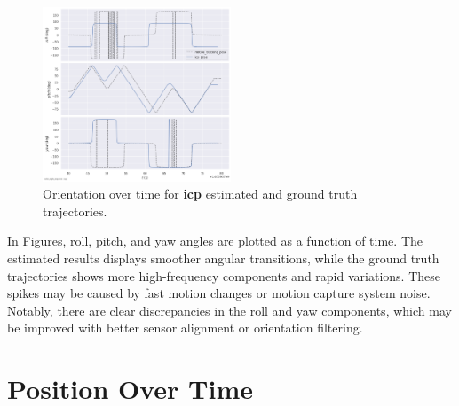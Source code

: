 \documentclass[11pt]{article}
\begin{document}
\begin{figure}[H]
    \centering
    \includegraphics[width=0.5\textwidth]{figures/evo_icp_rpy.png}
    \caption{Orientation over time for \textbf{icp} estimated and ground truth trajectories.}
    \label{fig:icp_rpy}
\end{figure}

\FloatBarrier %

In Figures, roll, pitch, and yaw angles are plotted as a function of time. The estimated results displays smoother angular transitions, while the ground truth trajectories shows more high-frequency components and rapid variations. These spikes may be caused by fast motion changes or motion capture system noise. Notably, there are clear discrepancies in the roll and yaw components, which may be improved with better sensor alignment or orientation filtering.

\section{Position Over Time}
\end{document}
